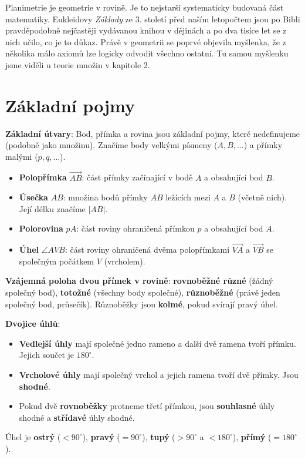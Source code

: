 \label{kap:planimetrie}

Planimetrie je geometrie v rovině. Je to nejstarší systematicky budovaná část matematiky. Eukleidovy \textit{Základy} ze 3. století před naším letopočtem jsou po Bibli pravděpodobně nejčastěji vydávanou knihou v dějinách a po dva tisíce let se z nich učilo, co je to důkaz. Právě v geometrii se poprvé objevila myšlenka, že z několika málo axiomů lze logicky odvodit všechno ostatní. Tu samou myšlenku jsme viděli u teorie množin v kapitole 2.

\section{Základní pojmy}\label{sec:plan-zakladni-pojmy}

\begin{definitionbox}
  \textbf{Základní útvary}: Bod, přímka a rovina jsou základní pojmy, které nedefinujeme (podobně jako množinu). Značíme body velkými písmeny ($A, B, \ldots$) a přímky malými ($p, q, \ldots$).
  \begin{itemize}
    \item \textbf{Polopřímka} $\overrightarrow{AB}$: část přímky začínající v bodě $A$ a obsahující bod $B$.
    \item \textbf{Úsečka} $AB$: množina bodů přímky $AB$ ležících mezi $A$ a $B$ (včetně nich). Její délku značíme $|AB|$.
    \item \textbf{Polorovina} $pA$: část roviny ohraničená přímkou $p$ a obsahující bod $A$.
    \item \textbf{Úhel} $\angle AVB$: část roviny ohraničená dvěma polopřímkami $\overrightarrow{VA}$ a $\overrightarrow{VB}$ se společným počátkem $V$ (vrcholem).
  \end{itemize}

  \textbf{Vzájemná poloha dvou přímek v rovině}: \textbf{rovnoběžné různé} (žádný společný bod), \textbf{totožné} (všechny body společné), \textbf{různoběžné} (právě jeden společný bod, průsečík). Různoběžky jsou \textbf{kolmé}, pokud svírají pravý úhel.
\end{definitionbox}

\begin{definitionbox}
  \textbf{Dvojice úhlů}:
  \begin{itemize}
    \item \textbf{Vedlejší úhly} mají společné jedno rameno a další dvě ramena tvoří přímku. Jejich součet je $180^\circ$.
    \item \textbf{Vrcholové úhly} mají společný vrchol a jejich ramena tvoří dvě přímky. Jsou \textbf{shodné}.
    \item Pokud dvě \textbf{rovnoběžky} protneme třetí přímkou, jsou \textbf{souhlasné} úhly shodné a \textbf{střídavé} úhly shodné.
  \end{itemize}
  Úhel je \textbf{ostrý} ($< 90^\circ$), \textbf{pravý} ($= 90^\circ$), \textbf{tupý} ($> 90^\circ$ a $< 180^\circ$), \textbf{přímý} ($= 180^\circ$).
\end{definitionbox}

